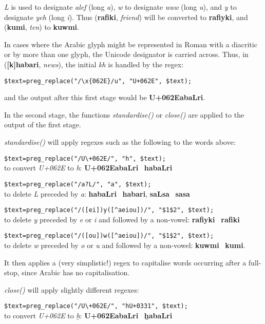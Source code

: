 \textit{L} is used to designate \textit{alef} (long \textit{a}), \textit{w} to designate \textit{waw} (long \textit{u}), and \textit{y} to designate \textit{yeh} (long \textit{i}).  Thus  (\textbf{rafiki}, \textit{friend}) will be converted to \textbf{rafiyki}, and  (\textbf{kumi}, \textit{ten}) to \textbf{kuwmi}.

In cases where the Arabic glyph might be represented in Roman with a diacritic or by more than one glyph, the Unicode designator is carried across.  Thus, in  (\textbf{[k]habari}, \textit{news}), the initial \textit{kh} is handled by the regex:

\verb|$text=preg_replace("/\x{062E}/u", "U+062E", $text);|

and the output after this first stage would be \textbf{U+062EabaLri}.

In the second stage, the functions \textit{standardise()} or \textit{close()} are applied to the output of the first stage.

\textit{standardise()} will apply regexes such as the following to the words above:

\verb|$text=preg_replace("/U\+062E/", "h", $text);|\\
to convert \textit{U+062E} to \textit{h}: \textbf{U+062EabaLri} \textrightarrow\ \textbf{habaLri}

\verb|$text=preg_replace("/a?L/", "a", $text);|\\
to delete \textit{L} preceded by \textit{a}: \textbf{habaLri} \textrightarrow\ \textbf{habari}, \textbf{saLsa} \textrightarrow\ \textbf{sasa}

\verb|$text=preg_replace("/([ei])y([^aeiou])/", "$1$2", $text);|\\
to delete \textit{y} preceded by \textit{e} or \textit{i} and followed by a non-vowel: \textbf{rafiyki} \textrightarrow\ \textbf{rafiki}

\verb|$text=preg_replace("/([ou])w([^aeiou])/", "$1$2", $text);|\\
to delete \textit{w} preceded by \textit{o} or \textit{u} and followed by a non-vowel: \textbf{kuwmi} \textrightarrow\ \textbf{kumi}.

It then applies a (very simplistic!) regex to capitalise words occurring after a full-stop, since Arabic has no capitalisation.

\textit{close()} will apply slightly different regexes:

\verb|$text=preg_replace("/U\+062E/", "hU+0331", $text);|\\
to convert \textit{U+062E} to \textit{ẖ}: \textbf{U+062EabaLri} \textrightarrow\ \textbf{ẖabaLri}

